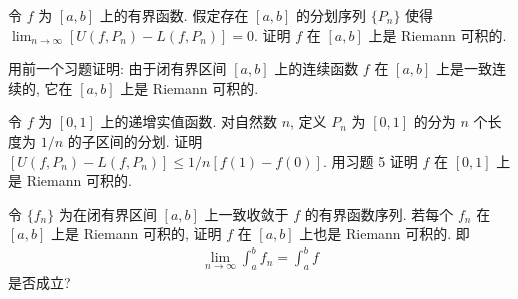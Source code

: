 \documentclass[../../main.tex]{subfiles}
\begin{document}
\begin{exercise}\label{exercise:ch04-05}
令 $f$ 为 $[a,b]$ 上的有界函数. 假定存在 $[a,b]$ 的分划序列 $\{P_{n}\}$ 使得 $\lim_{n\to\infty}[U(f,P_{n})-L(f,P_{n})]=0$. 证明 $f$ 在 $[a,b]$ 上是 Riemann 可积的.
\end{exercise}

\begin{exercise}\label{exercise:ch04-06}
用前一个习题证明: 由于闭有界区间 $[a,b]$ 上的连续函数 $f$ 在 $[a,b]$ 上是一致连续的, 它在 $[a,b]$ 上是 Riemann 可积的.
\end{exercise}

\begin{exercise}\label{exercise:ch04-07}
令 $f$ 为 $[0,1]$ 上的递增实值函数. 对自然数 $n$, 定义 $P_{n}$ 为 $[0,1]$ 的分为 $n$ 个长度为 $1/n$ 的子区间的分划. 证明 $[U(f,P_{n})-L(f,P_{n})]\leqslant 1/n[f(1)-f(0)]$. 用习题 5 证明 $f$ 在 $[0,1]$ 上是 Riemann 可积的.
\end{exercise}

\begin{exercise}\label{exercise:ch04-08}
令 $\{f_{n}\}$ 为在闭有界区间 $[a,b]$ 上一致收敛于 $f$ 的有界函数序列. 若每个 $f_{n}$ 在 $[a,b]$ 上是 Riemann 可积的, 证明 $f$ 在 $[a,b]$ 上也是 Riemann 可积的. 即
\begin{align*}
\lim_{n\to\infty}\int_{a}^{b}f_{n}=\int_{a}^{b}f
\end{align*}
是否成立?
\end{exercise}
\end{document}
